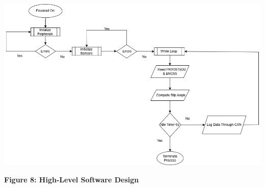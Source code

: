 \documentclass[12pt]{article}
\begin{document}
        \begin{center}
            \vspace{0.5cm}

            \includegraphics[width=1\textwidth]{resources/softwarediagram.png}

            \vspace{0.5cm}

            \textbf{Figure 8: High-Level Software Design}
            \label{sd}
        
        \end{center}

\end{document}
